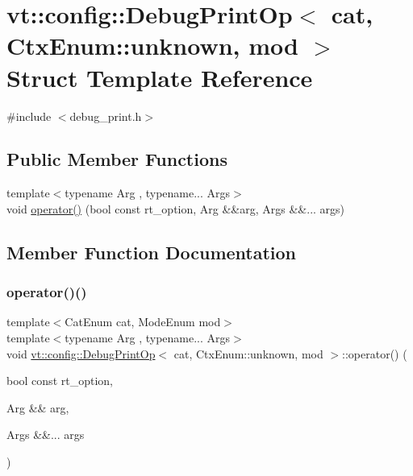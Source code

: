 \hypertarget{structvt_1_1config_1_1_debug_print_op_3_01cat_00_01_ctx_enum_1_1unknown_00_01mod_01_4}{}\section{vt\+:\+:config\+:\+:Debug\+Print\+Op$<$ cat, Ctx\+Enum\+:\+:unknown, mod $>$ Struct Template Reference}
\label{structvt_1_1config_1_1_debug_print_op_3_01cat_00_01_ctx_enum_1_1unknown_00_01mod_01_4}


{\ttfamily \#include $<$debug\+\_\+print.\+h$>$}

\subsection*{Public Member Functions}
\begin{DoxyCompactItemize}
\item 
{\footnotesize template$<$typename Arg , typename... Args$>$ }\\void \hyperlink{structvt_1_1config_1_1_debug_print_op_3_01cat_00_01_ctx_enum_1_1unknown_00_01mod_01_4_a83e448a616094e6beada289638f7edb4}{operator()} (bool const rt\+\_\+option, Arg \&\&arg, Args \&\&... args)
\end{DoxyCompactItemize}


\subsection{Member Function Documentation}
\mbox{\label{structvt_1_1config_1_1_debug_print_op_3_01cat_00_01_ctx_enum_1_1unknown_00_01mod_01_4_a83e448a616094e6beada289638f7edb4}} 
\subsubsection{\texorpdfstring{operator()()}{operator()()}}
{\footnotesize\ttfamily template$<$Cat\+Enum cat, Mode\+Enum mod$>$ \\
template$<$typename Arg , typename... Args$>$ \\
void \hyperlink{structvt_1_1config_1_1_debug_print_op}{vt\+::config\+::\+Debug\+Print\+Op}$<$ cat, Ctx\+Enum\+::unknown, mod $>$\+::operator() (\begin{DoxyParamCaption}\item[{bool const}]{rt\+\_\+option,  }\item[{Arg \&\&}]{arg,  }\item[{Args \&\&...}]{args }\end{DoxyParamCaption})\hspace{0.3cm}{\ttfamily [inline]}}



